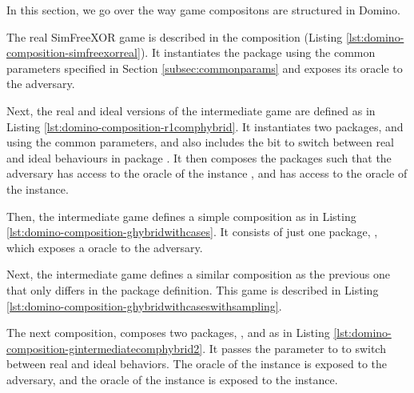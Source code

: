 In this section, we go over the way game compositons are structured in Domino. 

The real SimFreeXOR game is described in the composition  (Listing \ref{lst:domino-composition-simfreexorreal}). It instantiates the  package using the common parameters specified in Section \ref{subsec:commonparams} and exposes its  oracle to the adversary. 



Next, the real and ideal versions of the intermediate game  are defined as in Listing \ref{lst:domino-composition-r1comphybrid}. It instantiates two packages,  and  using the common parameters, and also includes the bit  to switch between real and ideal behaviours in package . It then composes the packages such that the adversary has access to the  oracle of the  instance , and  has access to the  oracle of the  instance.



Then, the intermediate game  defines a simple composition  as in Listing \ref{lst:domino-composition-ghybridwithcases}. It consists of just one package, , which exposes a  oracle to the adversary.



Next, the intermediate game  defines a similar composition as the previous one that only differs in the package definition. This game is described in Listing \ref{lst:domino-composition-ghybridwithcaseswithsampling}.



The next composition,  composes two packages,  , and  as in Listing \ref{lst:domino-composition-gintermediatecomphybrid2}. It passes the parameter  to  to switch between real and ideal behaviors. The  oracle of the  instance is exposed to the adversary, and the  oracle of the  instance is exposed to the  instance.

